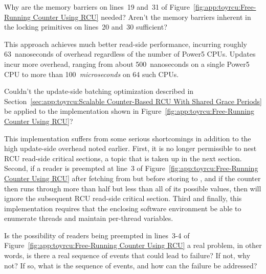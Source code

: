 \QuickQuiz{}
	Why are the memory barriers on lines~19 and~31 of
	Figure~\ref{fig:app:toyrcu:Free-Running Counter Using RCU}
	needed?
	Aren't the memory barriers inherent in the locking
	primitives on lines~20 and~30 sufficient?
 \QuickQuizEnd

This approach achieves much better read-side performance, incurring
roughly 63~nanoseconds of overhead regardless of the number of
Power5 CPUs.
Updates incur more overhead, ranging from about 500~nanoseconds on
a single Power5 CPU to more than 100~\emph{microseconds} on 64
such CPUs.

\QuickQuiz{}
	Couldn't the update-side batching optimization described in
	Section~\ref{sec:app:toyrcu:Scalable Counter-Based RCU With Shared Grace Periods}
	be applied to the implementation shown in
	Figure~\ref{fig:app:toyrcu:Free-Running Counter Using RCU}?
 \QuickQuizEnd

This implementation suffers from some serious shortcomings in
addition to the high update-side overhead noted earlier.
First, it is no longer permissible to nest RCU read-side critical
sections, a topic that is taken up in the next section.
Second, if a reader is preempted at line~3 of
Figure~\ref{fig:app:toyrcu:Free-Running Counter Using RCU} after fetching from
 but before storing to ,
and if the  counter then runs through more than half
but less than all of its possible values, then 
will ignore the subsequent RCU read-side critical section.
Third and finally, this implementation requires that the enclosing software
environment be able to enumerate threads and maintain per-thread
variables.

\QuickQuiz{}
	Is the possibility of readers being preempted in
	lines~3-4 of Figure~\ref{fig:app:toyrcu:Free-Running Counter Using RCU}
	a real problem, in other words, is there a real sequence
	of events that could lead to failure?
	If not, why not?
	If so, what is the sequence of events, and how can the
	failure be addressed?
 \QuickQuizEnd

